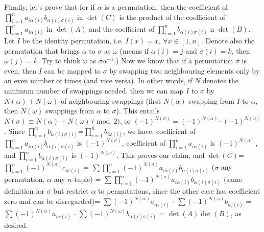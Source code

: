\documentclass[11pt,a4paper]{article}
\begin{document}
\begin {enumerate}
Finally, let's prove that for if $\alpha$ is a permutation, then the coefficient of $\displaystyle\prod_{i=1}^{n}a_{i\alpha (i)}b_{\alpha (i)\sigma (i)}$ in $\det (C)$ is the product of the coefficient of $\displaystyle\prod_{i=1}^{n}a_{i\alpha (i)}$ in $\det (A)$ and the coefficient of $\displaystyle\prod_{i=1}^{n}b_{\alpha (i)\sigma (i)}$ n $\det (B)$. Let $I$ be the identity permutation, i.e. $I(x)=x$, $\forall x\in[1,n]$. Denote also the permutation that brings $\alpha$ to $\sigma$ as $\omega$ (means if $\alpha (i)=j$ and $\sigma (i)=k$, then $\omega (j)=k$. Try to think $\omega$ as $\sigma\alpha^{-1}$.) Now we know that if a permutation $\sigma$ is even, then $I$ can be mapped to $\sigma$ by swapping two neighbouring elements only by an even number of times (and vice versa). In other words, if $N$ denotes the minimum number of swappings needed, then we can map $I$ to $\sigma$ by $N(\alpha)+N(\omega)$ of neighbouring swappings (first $N(\alpha)$ swapping from $I$ to $\alpha$, then $N(\omega)$ swappings from $\alpha$ to $\sigma$).  This entails $N(\sigma)\equiv N(\alpha)+N(\omega)\pmod {2}$, or $(-1)^{N(\sigma)}=(-1)^{N(\alpha)}\cdot (-1)^{N(\omega)}$. Since $\displaystyle\prod_{i=1}^{n}b_{\alpha (i)\sigma (i)}$=$\displaystyle\prod_{i=1}^{n}b_{i\omega (i)}$, we have: coefficient of $\displaystyle\prod_{i=1}^{n}a_{i\alpha (i)}b_{\alpha (i)\sigma (i)}$ is $(-1)^{N(\sigma)}$, coefficient of $\displaystyle\prod_{i=1}^{n}a_{i\alpha (i)}$ is $(-1)^{N(\alpha)}$, and $\displaystyle\prod_{i=1}^{n}b_{\alpha (i)\sigma (i)}$ is $(-1)^{N(\omega)}$. This proves our claim, and $\det (C)$=$\displaystyle\prod_{i=1}^{n}(-1)^{N(\sigma)}c_{i\sigma (i)}$ = $\displaystyle\sum\displaystyle\prod_{i=1}^{n}(-1)^{N(\sigma)}a_{i\alpha (i)}b_{\alpha (i)\sigma (i)}$ ($\sigma$ any permutation, $\alpha$ any $n$-tuple) = $\displaystyle\sum\displaystyle\prod_{i=1}^{n}(-1)^{N(\sigma)}a_{i\alpha (i)}b_{\alpha (i)\sigma (i)}$ (same definition for $\sigma$ but restrict $\alpha$ to permutations, since the other case has coefficient zero and can be disregarded)= $\displaystyle\sum(-1)^{N(\alpha)}a_{i\alpha (i)}$ $\cdot$ $\displaystyle\sum(-1)^{N(\omega)}b_{i\omega (i)}$ = $\displaystyle\sum(-1)^{N(\alpha)}a_{i\alpha (i)}$ $\cdot$ $\displaystyle\sum(-1)^{N(\omega)}b_{\alpha (i)\sigma (i)}$ = $\det (A) \det (B)$, as desired.
\end{enumerate}
\end{document}
